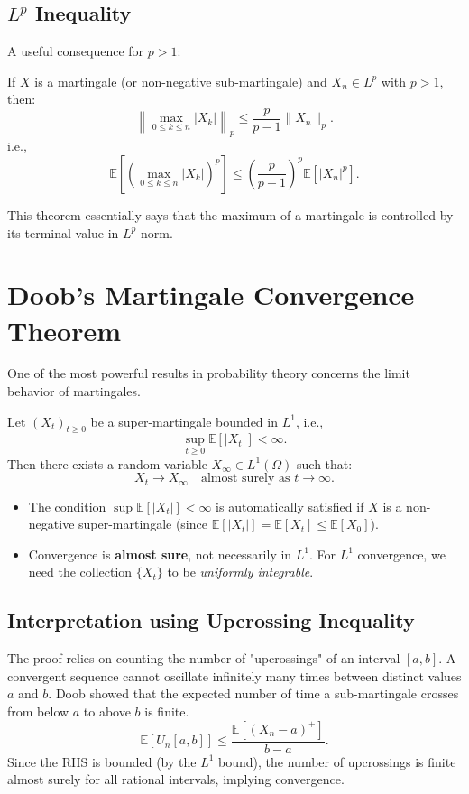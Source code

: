 \subsection{\texorpdfstring{$L^p$}{Lp} Inequality}

A useful consequence for $p > 1$:

\begin{theorem}
If $X$ is a martingale (or non-negative sub-martingale) and $X_n \in L^p$ with $p > 1$,
then:
\[
\left\| \max_{0 \le k \le n} |X_k| \right\|_p \le \frac{p}{p-1} \|X_n\|_p.
\]
i.e.,
\[
\mathbb{E}\left[ \left( \max_{0 \le k \le n} |X_k| \right)^p \right] \le \left( \frac{p}{p-1} \right)^p \mathbb{E}[|X_n|^p].
\]
\end{theorem}
This theorem essentially says that the maximum of a martingale is controlled by its terminal value in $L^p$ norm.

\section{Doob's Martingale Convergence Theorem}

One of the most powerful results in probability theory concerns the limit behavior of martingales.

\begin{theorem}
Let $(X_t)_{t \ge 0}$ be a super-martingale bounded in $L^1$, i.e.,
\[
\sup_{t \ge 0} \mathbb{E}[|X_t|] < \infty.
\]
Then there exists a random variable $X_\infty \in L^1(\Omega)$ such that:
\[
X_t \to X_\infty \quad \text{almost surely as } t \to \infty.
\]
\end{theorem}

\begin{remark}
\begin{itemize}
    \item The condition $\sup \mathbb{E}[|X_t|] < \infty$ is automatically satisfied if $X$ is a non-negative super-martingale (since $\mathbb{E}[|X_t|] = \mathbb{E}[X_t] \le \mathbb{E}[X_0]$).
    \item Convergence is \textbf{almost sure}, not necessarily in $L^1$. For $L^1$ convergence, we need the collection $\{X_t\}$ to be \textit{uniformly integrable}.
\end{itemize}
\end{remark}

\subsection{Interpretation using Upcrossing Inequality}
The proof relies on counting the number of "upcrossings" of an interval $[a, b]$. A convergent sequence cannot oscillate infinitely many times between distinct values $a$ and $b$. Doob showed that the expected number of time a sub-martingale crosses from below $a$ to above $b$ is finite.
\[
\mathbb{E}[U_n[a,b]] \le \frac{\mathbb{E}[(X_n - a)^+]}{b-a}.
\]
Since the RHS is bounded (by the $L^1$ bound), the number of upcrossings is finite almost surely for all rational intervals, implying convergence.
